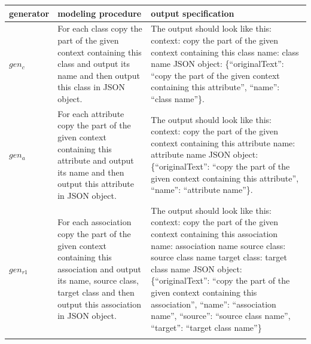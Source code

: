 \begin{table}[!h]
    \scriptsize
    \centering
    \setlength{\tabcolsep}{0.5em}
\begin{tabular}{@{}l>{\raggedright\arraybackslash}p{}>{\raggedright\arraybackslash}p{}@{}}
        generator & modeling procedure & output specification \\
    \toprule
    \addlinespace
$gen_c$ & For each class copy the part of the given context containing this class and output its name and then output this class in JSON object. & The output should look like this: \newline
context: copy the part of the given context containing this class \newline
name: class name \newline
JSON object: \{``originalText'': ``copy the part of the given context containing this attribute'', ``name'': ``class name''\}. \\
\addlinespace

$gen_a$ & For each attribute copy the part of the given context containing this attribute and output its name and then output this attribute in JSON object. & The output should look like this: \newline
context: copy the part of the given context containing this attribute \newline
name: attribute name \newline
JSON object: \{``originalText'': ``copy the part of the given context containing this attribute'', ``name'': ``attribute name''\}. \\
\addlinespace

$gen_{r1}$ & For each association copy the part of the given context containing this association and output its name, source class, target class and then output this association in JSON object. &
The output should look like this: \newline
context: copy the part of the given context containing this association \newline
name: association name \newline
source class: source class name \newline
target class: target class name \newline
JSON object: \{``originalText'': ``copy the part of the given context containing this association'', ``name'': ``association name'', ``source'': ``source class name'', ``target'': ``target class name''\} \\
\addlinespace


\end{tabular}
\end{table}
